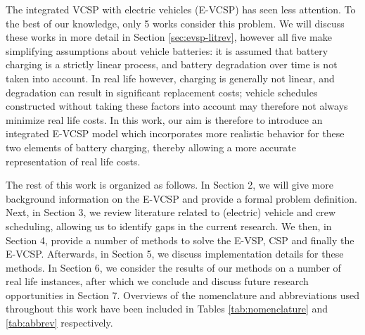 \documentclass[]{article}
\begin{document}
The integrated VCSP with electric vehicles (E-VCSP) has seen less attention. To the best of our knowledge, only 5 works consider this problem. We will discuss these works in more detail in Section \ref{sec:evsp-litrev}, however all five make simplifying assumptions about vehicle batteries: it is assumed that battery charging is a strictly linear process, and battery degradation over time is not taken into account. In real life however, charging is generally not linear, and degradation can result in significant replacement costs; vehicle schedules constructed without taking these factors into account may therefore not always minimize real life costs. In this work, our aim is therefore to introduce an integrated E-VCSP model which incorporates more realistic behavior for these two elements of battery charging, thereby allowing a more accurate representation of real life costs.

The rest of this work is organized as follows. In Section 2, we will give more background information on the E-VCSP and provide a formal problem definition. Next, in Section 3, we review literature related to (electric) vehicle and crew scheduling, allowing us to identify gaps in the current research. We then, in Section 4, provide a number of methods to solve the E-VSP, CSP and finally the E-VCSP. Afterwards, in Section 5, we discuss implementation details for these methods. In Section 6, we consider the results of our methods on a number of real life instances, after which we conclude and discuss future research opportunities in Section 7. Overviews of the nomenclature and abbreviations used throughout this work have been included in Tables \ref{tab:nomenclature} and \ref{tab:abbrev} respectively.
\end{document}
